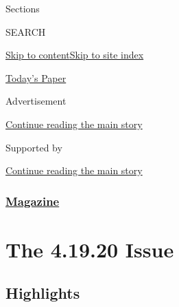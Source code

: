 Sections

SEARCH

\protect\hyperlink{site-content}{Skip to
content}\protect\hyperlink{site-index}{Skip to site index}

\href{https://myaccount.nytimes3xbfgragh.onion/auth/login?response_type=cookie\&client_id=vi}{}

\href{https://www.nytimes3xbfgragh.onion/section/todayspaper}{Today's
Paper}

Advertisement

\protect\hyperlink{after-top}{Continue reading the main story}

Supported by

\protect\hyperlink{after-sponsor}{Continue reading the main story}

\hypertarget{magazine}{%
\subsubsection{\texorpdfstring{\href{/section/magazine}{Magazine}}{Magazine}}\label{magazine}}

\hypertarget{the-41920-issue}{%
\section{The 4.19.20 Issue}\label{the-41920-issue}}

\hypertarget{highlights}{%
\subsection{Highlights}\label{highlights}}

